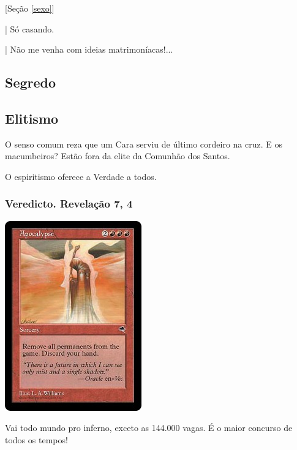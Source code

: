 \documentclass[12pt,a4paper]{article}
\begin{document}
			[Se\c{c}\~ao \ref{sexo}]

| S\'o casando.

| N\~ao me venha com ideias matrimon\'iacas!...

		\subsection{Segredo}
			\begin{flushright}
			\end{flushright}

		\subsection{Elitismo}
			\begin{flushright}
			\end{flushright}

			O senso comum reza que um Cara serviu de último cordeiro\cite{x} na cruz. E os macumbeiros? Est\~ao fora da elite da Comunh\~ao dos Santos.

			O espiritismo oferece a Verdade a todos.

		\subsubsection {Veredicto. Revela\c{c}\~ao 7, 4}

			\begin{flushright}
			\end{flushright}

			\begin{center}
			\includegraphics{apocalipse}
			\end{center}

			Vai todo mundo pro inferno, exceto as 144.000 vagas. \'E o maior concurso de todos os tempos!
\end{document}
